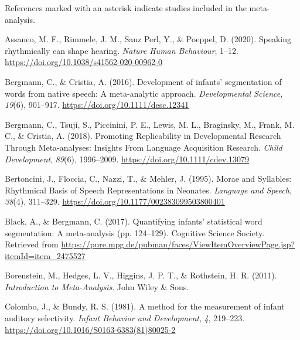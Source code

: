 \documentclass[
  man,mask,floatsintext]{apa6}
\newlength{\cslhangindent}
\newlength{\cslentryspacingunit} %
\newenvironment{CSLReferences}[2] %
 {%
  \setlength{\parindent}{0pt}
  \ifodd #1
  \let\oldpar\par
  \def\par{\hangindent=\cslhangindent\oldpar}
  \fi
  \setlength{\parskip}{#2\cslentryspacingunit}
 }%
 {}
\begin{document}
\begingroup
\setlength{\parindent}{-0.5in}
\setlength{\leftskip}{0.5in}

References marked with an asterisk indicate studies included in the meta-analysis.

\hypertarget{refs}{}
\begin{CSLReferences}{1}{0}
\leavevmode{}%
Assaneo, M. F., Rimmele, J. M., Sanz Perl, Y., \& Poeppel, D. (2020). Speaking rhythmically can shape hearing. \emph{Nature Human Behaviour}, 1--12. \url{https://doi.org/10.1038/s41562-020-00962-0}

\leavevmode{}%
Bergmann, C., \& Cristia, A. (2016). Development of infants' segmentation of words from native speech: A meta-analytic approach. \emph{Developmental Science}, \emph{19}(6), 901--917. \url{https://doi.org/10.1111/desc.12341}

\leavevmode{}%
Bergmann, C., Tsuji, S., Piccinini, P. E., Lewis, M. L., Braginsky, M., Frank, M. C., \& Cristia, A. (2018). Promoting {Replicability} in {Developmental} {Research} {Through} {Meta}-analyses: {Insights} {From} {Language} {Acquisition} {Research}. \emph{Child Development}, \emph{89}(6), 1996--2009. \url{https://doi.org/10.1111/cdev.13079}

\leavevmode{}%
Bertoncini, J., Floccia, C., Nazzi, T., \& Mehler, J. (1995). Morae and {Syllables}: {Rhythmical} {Basis} of {Speech} {Representations} in {Neonates}. \emph{Language and Speech}, \emph{38}(4), 311--329. \url{https://doi.org/10.1177/002383099503800401}

\leavevmode{}%
Black, A., \& Bergmann, C. (2017). Quantifying infants' statistical word segmentation: {A} meta-analysis (pp. 124--129). Cognitive Science Society. Retrieved from \url{https://pure.mpg.de/pubman/faces/ViewItemOverviewPage.jsp?itemId=item_2475527}

\leavevmode{}%
Borenstein, M., Hedges, L. V., Higgins, J. P. T., \& Rothstein, H. R. (2011). \emph{Introduction to {Meta}-{Analysis}}. John Wiley \& Sons.

\leavevmode{}%
Colombo, J., \& Bundy, R. S. (1981). A method for the measurement of infant auditory selectivity. \emph{Infant Behavior and Development}, \emph{4}, 219--223. \url{https://doi.org/10.1016/S0163-6383(81)80025-2}


\end{CSLReferences}
\end{document}

